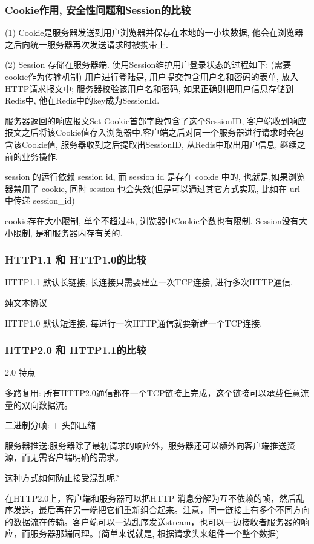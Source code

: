 \documentclass[UTF8]{ctexart}
\begin{document}
\subsubsection{Cookie作用, 安全性问题和Session的比较}
(1) Cookie是服务器发送到用户浏览器并保存在本地的一小块数据,  他会在浏览器之后向统一服务器再次发送请求时被携带上.
\par
(2) Session 存储在服务器端. 使用Session维护用户登录状态的过程如下: (需要cookie作为传输机制)
用户进行登陆是, 用户提交包含用户名和密码的表单, 放入HTTP请求报文中;
服务器校验该用户名和密码, 如果正确则把用户信息存储到Redis中, 他在Redis中的key成为SessionId.
\par
服务器返回的响应报文Set-Cookie首部字段包含了这个SessionID, 客户端收到响应报文之后将该Cookie值存入浏览器中.客户端之后对同一个服务器进行请求时会包含该Cookie值, 服务器收到之后提取出SessionID, 从Redis中取出用户信息, 继续之前的业务操作.
\par
session 的运行依赖 session id, 而 session id 是存在 cookie 中的, 也就是,如果浏览器禁用了 cookie, 同时 session 也会失效(但是可以通过其它方式实现, 比如在 url 中传递 session\_id)
\par
cookie存在大小限制, 单个不超过4k, 浏览器中Cookie个数也有限制.
Session没有大小限制, 是和服务器内存有关的.
\subsubsection{HTTP1.1 和 HTTP1.0的比较}
HTTP1.1 默认长链接, 长连接只需要建立一次TCP连接, 进行多次HTTP通信.

纯文本协议


HTTP1.0 默认短连接, 每进行一次HTTP通信就要新建一个TCP连接.
\subsubsection{HTTP2.0 和 HTTP1.1的比较}
2.0 特点

多路复用: 所有HTTP2.0通信都在一个TCP链接上完成，这个链接可以承载任意流量的双向数据流。

二进制分帧: + 头部压缩

服务器推送:服务器除了最初请求的响应外，服务器还可以额外向客户端推送资源，而无需客户端明确的需求。

这种方式如何防止接受混乱呢?

在HTTP2.0上，客户端和服务器可以把HTTP 消息分解为互不依赖的帧，然后乱序发送，最后再在另一端把它们重新组合起来。注意，同一链接上有多个不同方向的数据流在传输。客户端可以一边乱序发送stream，也可以一边接收者服务器的响应，而服务器那端同理。(简单来说就是, 根据请求头来组件一个整个数据)
\end{document}
